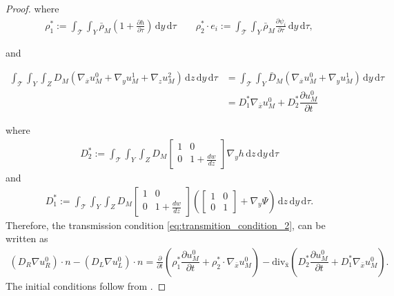 \documentclass[11pt]{article}
\def\p{\partial}
\def\T{\mathcal{T}}
\newcommand{\di}[1]{\,\mathrm{d}#1}
\begin{document}
\begin{proof}
    where
    \begin{align*}
        \rho_{1}^*:=\int_{\T}\int_{Y}\bar \rho_M\left(1+\frac{\p h}{\p \tau}\right)\di{y}\di{\tau} \qquad   {\rho_{2}^*}\cdot e_i:=\int_{\T}\int_{Y}\bar \rho_M \frac{\p \psi_i}{\p \tau}\di{y}\di{\tau},
    \end{align*}
   
and
   
    \begin{align*}
        \int_\T\int_{Y}\int_ZD_M \left( \nabla_{\overline{x}}u_M^0+\nabla_y u_M^1+\nabla_zu_M^2\right)\di{z}\di{y}\di{\tau}&= \int_{\T}\int_{Y}\bar D_M \left( \nabla_{\overline{x}}u_M^0+\nabla_y u_M^1\right)\di{y}\di{\tau}\\
        &=D_1^* \nabla_{\bar x}u_M^0+D_2^*\dfrac{\partial u_M^0}{\partial t}
    \end{align*}

    where
    \begin{align*}
        D_2^*:=\int_\T\int_{Y}\int_Z D_M\begin{bmatrix}
            1&0\\
            0&1+\frac{dw}{dz}
        \end{bmatrix}\nabla_y h\di{z}\di{y}\di{\tau}
    \end{align*}
    and 
    \begin{align*}
        D_1^*:=\int_\T\int_{Y}\int_Z D_M \begin{bmatrix}
            1&0\\
            0&1+\frac{dw}{dz}
        \end{bmatrix}
       \left( \begin{bmatrix}
            1&0\\
            0&1
        \end{bmatrix}+\nabla_y\Psi\right)\di{z}\di{y}\di{\tau}.
    \end{align*}
    Therefore, the transmission condition \eqref{eq:transmition_condition_2}, can be written as 
    \begin{multline*}
        {(D_R \nabla u_R^0)\cdot n-(D_L \nabla u_L^0)\cdot n}=\frac{\p}{\p t}\left(\rho_{1}^*\dfrac{\partial u_M^0}{\partial t}+\rho_{2}^*\cdot \nabla_{\bar x}u_M^0\right)
        -\mathrm{div_{\bar x}}\left(D_2^*\dfrac{\partial u_M^0}{\partial t}+D_1^* \nabla_{\bar x}u_M^0\right).
    \end{multline*}
The initial conditions follow from .
\end{proof}
\end{document}
